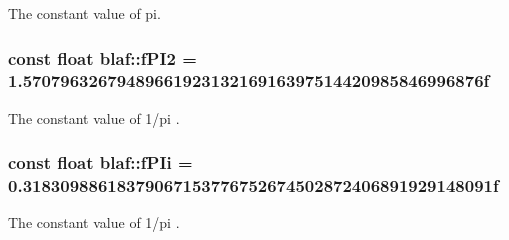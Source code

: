 \-The constant value of pi. 

\hypertarget{namespaceblaf_a412381b69e677733ea60507300a9ed89}{
\subsubsection[{f\-P\-I2}]{\setlength{\rightskip}{0pt plus 5cm}const float {\bf blaf\-::f\-P\-I2} = 1.\-5707963267948966192313216916397514420985846996876f}}\label{namespaceblaf_a412381b69e677733ea60507300a9ed89}


\-The constant value of 1/pi . 

\hypertarget{namespaceblaf_af3ff8c6e001f8a2feb4a77da9bf2e6c0}{
\subsubsection[{f\-P\-Ii}]{\setlength{\rightskip}{0pt plus 5cm}const float {\bf blaf\-::f\-P\-Ii} = 0.\-31830988618379067153776752674502872406891929148091f}}\label{namespaceblaf_af3ff8c6e001f8a2feb4a77da9bf2e6c0}


\-The constant value of 1/pi . 

